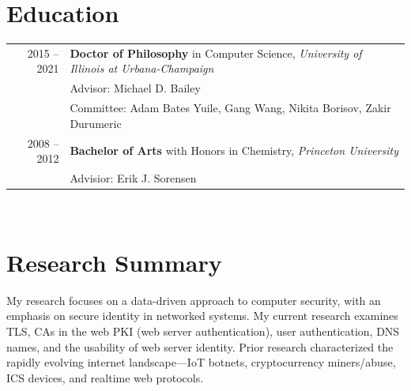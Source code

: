\documentclass[10pt,singlecolumn]{article} %
\begin{document}

\section{Education} 

\begin{tabular}{rl} %


2015 -- 2021 & \textbf{Doctor of Philosophy} in Computer Science, \textit{University of Illinois at Urbana-Champaign}\\ 
& Advisor: Michael D. Bailey \\
& Committee: Adam Bates Yuile, Gang Wang, Nikita Borisov, Zakir Durumeric \\
	 

2008 -- 2012 & \textbf{Bachelor of Arts} with Honors in Chemistry,  \textit{Princeton University}\\
& Advisior: Erik J. Sorensen \\
	  
\end{tabular} \\

\section{Research Summary} 

My research focuses on a data-driven approach to computer security, with an emphasis on 
secure identity in networked systems. My current research examines TLS, CAs in the web PKI (web server authentication),
user authentication, DNS names, and the usability of web server identity. Prior research
characterized the rapidly evolving internet landscape---IoT botnets, cryptocurrency miners/abuse, ICS devices, 
and realtime web protocols. 

\vspace{0.2cm}
\end{document}
